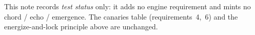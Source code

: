 This note records \emph{test status} only: it adds no engine requirement and mints no chord / echo / emergence. The canaries table (requirements~4,~6) and the energize-and-lock principle above are unchanged.
%
%
